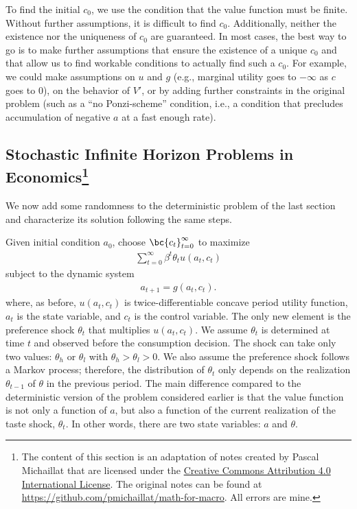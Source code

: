 \documentclass[\topdir/lecture\_notes.tex]{subfiles}
\begin{document}
To find the initial $c_0$, we use the condition that the value function must be finite. Without further assumptions, it is difficult to find $c_0$. Additionally, neither the existence nor the uniqueness of $c_0$ are guaranteed. In most cases, the best way to go is to make further assumptions that ensure the existence of a unique $c_0$ and that allow us to find workable conditions to actually find such a $c_0$. For example, we could make assumptions on $u$ and $g$ (e.g., marginal utility goes to $-\infty$ as $c$ goes to $0$), on the behavior of $V'$, or by adding further constraints in the original problem (such as a ``no Ponzi-scheme'' condition, i.e., a condition that precludes accumulation of negative $a$ at a fast enough rate).

\subsection[Stochastic Infinite Horizon Problems in Economics]{Stochastic Infinite Horizon Problems in Economics\footnote{The content of this section is an adaptation of notes created by Pascal Michaillat that are licensed under the \href{https://creativecommons.org/licenses/by/4.0/}{Creative Commons Attribution 4.0 International License}. The original notes can be found at \href{https://github.com/pmichaillat/math-for-macro}{https://github.com/pmichaillat/math-for-macro}. All errors are mine.}}
We now add some randomness to the deterministic problem of the last section and characterize its solution following the same steps.

Given initial condition $a_{0}$, choose $\bc{c_{t}}_{t=0}^{\infty}$ to maximize
\begin{align*}
\sum_{t=0}^{\infty}\beta^{t} \theta_t u(a_{t},c_{t})
\end{align*}
subject to the dynamic system
\begin{align}
a_{t+1}=g(a_{t},c_{t}).
\end{align}
where, as before, $u(a_{t},c_{t})$ is twice-differentiable concave period utility function, $a_t$ is the state variable, and $c_t$ is the control variable. The only new element is the preference shock $\theta_t$ that multiplies $u(a_t,c_t)$. We assume $\theta_t$ is determined at time $t$ and observed before the consumption decision. The shock can take only two values: $\theta_h$ or $\theta_l$ with $\theta_h > \theta_l > 0$. We also assume the preference shock follows a Markov process; therefore, the distribution of $\theta_t$ only depends on the realization $\theta_{t-1}$ of $\theta$ in the previous period. The main difference compared to the deterministic version of the problem considered earlier is that the value function is not only a function of $a$, but also a function of the current realization of the taste shock, $\theta_t$. In other words, there are two state variables: $a$ and $\theta$.
\end{document}
